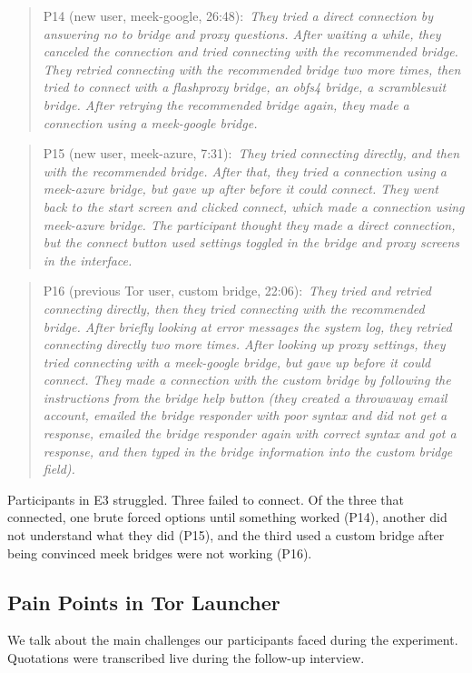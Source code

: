 \documentclass[USenglish,oneside,twocolumn]{article}
\newcommand{\pquote}[2]{
\begin{quotation}
\noindent #1:~\textit{#2}
\end{quotation}
}
\begin{document}
\pquote{P14 (new user, meek-google, 26:48)}{They tried a direct connection by answering no to bridge and proxy questions. After waiting a while, they canceled the connection and tried connecting with the recommended bridge. They retried connecting with the recommended bridge two more times, then tried to connect with a flashproxy bridge, an obfs4 bridge, a scramblesuit bridge. After retrying the recommended bridge again, they made a connection using a meek-google bridge.}

\pquote{P15 (new user, meek-azure, 7:31)}{They tried connecting directly, and then with the recommended bridge. After that, they tried a connection using a meek-azure bridge, but gave up after before it could connect. They went back to the start screen and clicked connect, which made a connection using meek-azure bridge. The participant thought they made a direct connection, but the connect button used settings toggled in the bridge and proxy screens in the interface.}

\pquote{P16 (previous Tor user, custom bridge, 22:06)}{They tried and retried connecting directly, then they tried connecting with the recommended bridge. After briefly looking at error messages the system log, they retried connecting directly two more times. After looking up proxy settings, they tried connecting with a meek-google bridge, but gave up before it could connect. They made a connection with the custom bridge by following the instructions from the bridge help button (they created a throwaway email account, emailed the bridge responder with poor syntax and did not get a response, emailed the bridge responder again with correct syntax and got a response, and then typed in the bridge information into the custom bridge field).}

Participants in E3 struggled. Three failed to connect. Of the three that connected, one brute forced options until something worked (P14), another did not understand what they did (P15), and the third used a custom bridge after being convinced meek bridges were not working (P16). 

\subsection{Pain Points in Tor Launcher} 
\label{sec:pain-points}
We talk about the main challenges our participants faced during the experiment. 
Quotations were transcribed live during the follow-up interview.
\end{document}
